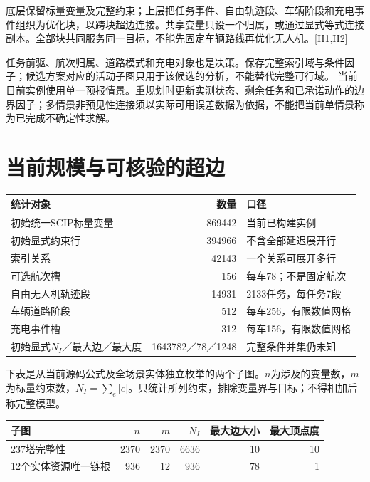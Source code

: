 \noindent 底层保留标量变量及完整约束；上层把任务事件、自由轨迹段、车辆阶段和充电事件组织为优化块，以跨块超边连接。共享变量只设一个归属，或通过显式等式连接副本。全部块共同服务同一目标，不能先固定车辆路线再优化无人机。[H1,H2]

\noindent 任务前驱、航次归属、道路模式和充电对象也是决策。保存完整索引域与条件因子；候选方案对应的活动子图只用于该候选的分析，不能替代完整可行域。
\noindent 当前日前实例使用单一预报情景。重规划时更新实测状态、剩余任务和已承诺动作的边界因子；多情景非预见性连接须以实际可用误差数据为依据，不能把当前单情景称为已完成不确定性求解。
\clearpage

\section*{当前规模与可核验的超边}
\begin{center}\small
\begin{tabular}{p{73mm}r p{42mm}}\toprule
统计对象 & 数量 & 口径\\\midrule
初始统一SCIP标量变量 & 869442 & 当前已构建实例\\
初始显式约束行 & 394966 & 不含全部延迟展开行\\
索引关系 & 42143 & 一个关系可展开多行\\
可选航次槽 & 156 & 每车78；不是固定航次\\
自由无人机轨迹段 & 14931 & 2133任务，每任务7段\\
车辆道路阶段 & 512 & 每车256，有限数值网格\\
充电事件槽 & 312 & 每车156，有限数值网格\\
初始显式$N_I$／最大边／最大度 & 1643782／78／1248 & 完整条件并集仍未知\\\bottomrule
\end{tabular}\end{center}

\noindent 下表是从当前源码公式及全场景实体独立枚举的两个子图。$n$为涉及的变量数，$m$为标量约束数，$N_I=\sum_e|e|$。只统计所列约束，排除变量界与目标；不得相加后称完整模型。

\begin{center}\small
\begin{tabular}{p{40mm}rrrrr}\toprule
子图 & $n$ & $m$ & $N_I$ & 最大边大小 & 最大顶点度\\\midrule
237塔完整性 & 2370 & 2370 & 6636 & 10 & 10\\
12个实体资源唯一链根 & 936 & 12 & 936 & 78 & 1\\\bottomrule
\end{tabular}\end{center}

